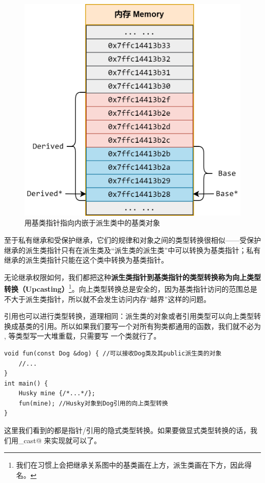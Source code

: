 \begin{figure}[htbp]
    \centering
    \includegraphics[width=.7\textwidth]{../images/generalized_parts/10_derived_class_object_and_subobject_in_memory.drawio.png}
    \caption{用基类指针指向内嵌于派生类中的基类对象}
\end{figure}
至于私有继承和受保护继承，它们的规律和对象之间的类型转换很相似——受保护继承的派生类指针只有在派生类及``派生类的派生类''中可以转换为基类指针；私有继承的派生类指针只能在这个类中转换为基类指针。\par
无论继承权限如何，我们都把这种\textbf{派生类指针到基类指针的类型转换称为向上类型转换（Upcasting）}\footnote{我们在习惯上会把继承关系图中的基类画在上方，派生类画在下方，因此得名。}。向上类型转换总是安全的，因为基类指针访问的范围总是不大于派生类指针，所以就不会发生访问内存``越界''这样的问题。\par
引用也可以进行类型转换，道理相同：派生类的对象或者引用类型可以向上类型转换成基类的引用。所以如果我们要写一个对所有狗类都通用的函数，我们就不必为 \lstinline@Husky@, \lstinline@Retriever@ 等类型写一大堆重载，只需要写 \lstinline@Dog@ 一个类就行了。
\begin{lstlisting}
void fun(const Dog &dog) { //可以接收Dog类及其public派生类的对象
    //...
}
int main() {
    Husky mine {/*...*/};
    fun(mine); //Husky对象到Dog引用的向上类型转换
}
\end{lstlisting}\par
这里我们看到的都是指针/引用的隐式类型转换。如果要做显式类型转换的话，我们用\newline\lstinline@static_cast@ 来实现就可以了。\par
